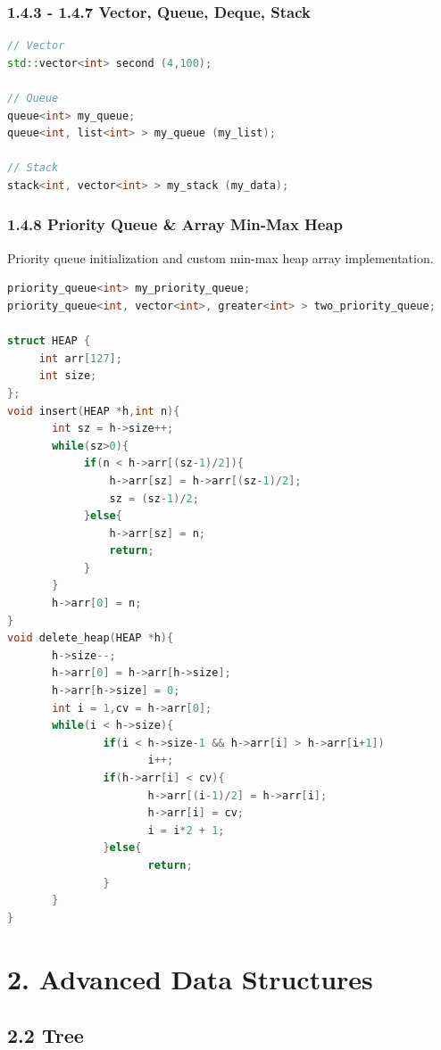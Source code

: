 \documentclass[10pt, a4paper, twocolumn]{article}
\begin{document}
\subsubsection{1.4.3 - 1.4.7 Vector, Queue, Deque, Stack}
\begin{lstlisting}[language=C++]
// Vector
std::vector<int> second (4,100);

// Queue
queue<int> my_queue;
queue<int, list<int> > my_queue (my_list);

// Stack
stack<int, vector<int> > my_stack (my_data);
\end{lstlisting}

\subsubsection{1.4.8 Priority Queue \& Array Min-Max Heap}
Priority queue initialization and custom min-max heap array implementation.
\begin{lstlisting}[language=C++]
priority_queue<int> my_priority_queue;
priority_queue<int, vector<int>, greater<int> > two_priority_queue;

struct HEAP {
     int arr[127];
     int size;
};
void insert(HEAP *h,int n){
       int sz = h->size++;
       while(sz>0){
            if(n < h->arr[(sz-1)/2]){
                h->arr[sz] = h->arr[(sz-1)/2];
                sz = (sz-1)/2;
            }else{
                h->arr[sz] = n;
                return;
            }
       }
       h->arr[0] = n;
}
void delete_heap(HEAP *h){
       h->size--;
       h->arr[0] = h->arr[h->size];
       h->arr[h->size] = 0;
       int i = 1,cv = h->arr[0];
       while(i < h->size){
               if(i < h->size-1 && h->arr[i] > h->arr[i+1])
                      i++;
               if(h->arr[i] < cv){
                      h->arr[(i-1)/2] = h->arr[i];
                      h->arr[i] = cv;
                      i = i*2 + 1;
               }else{
                      return;
               }
       }
}
\end{lstlisting}

\section{2. Advanced Data Structures}

\subsection{2.2 Tree}
\end{document}
